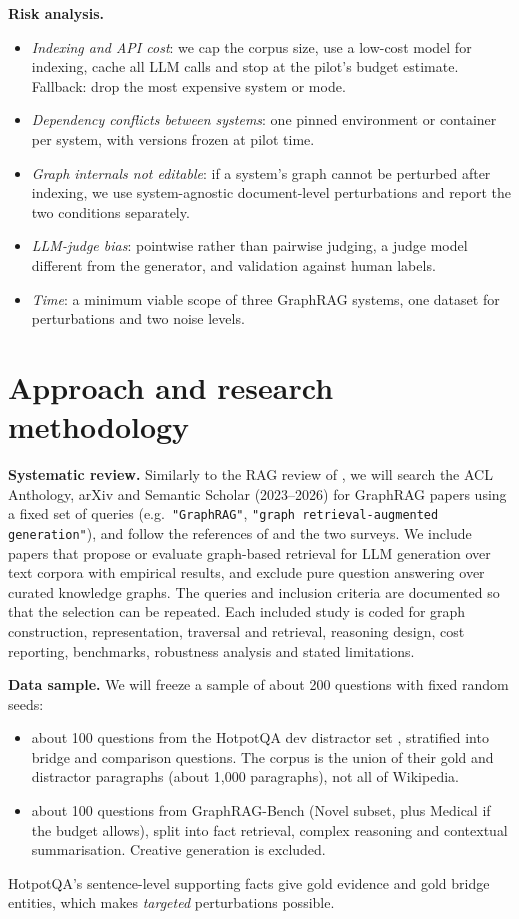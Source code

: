 \documentclass[11pt]{article}
\begin{document}
\textbf{Risk analysis.}
\begin{itemize}
\item \emph{Indexing and API cost}: we cap the corpus size, use a low-cost model for indexing, cache all LLM calls and stop at the pilot's budget estimate. Fallback: drop the most expensive system or mode.
\item \emph{Dependency conflicts between systems}: one pinned environment or container per system, with versions frozen at pilot time.
\item \emph{Graph internals not editable}: if a system's graph cannot be perturbed after indexing, we use system-agnostic document-level perturbations and report the two conditions separately.
\item \emph{LLM-judge bias}: pointwise rather than pairwise judging, a judge model different from the generator, and validation against human labels.
\item \emph{Time}: a minimum viable scope of three GraphRAG systems, one dataset for perturbations and two noise levels.
\end{itemize}

\section{Approach and research methodology}
\label{sec:method}

\textbf{Systematic review.} Similarly to the RAG review of , we will search the ACL Anthology, arXiv and Semantic Scholar (2023--2026) for GraphRAG papers using a fixed set of queries (e.g.\ \texttt{"GraphRAG"}, \texttt{"graph retrieval-augmented generation"}), and follow the references of  and the two surveys. We include papers that propose or evaluate graph-based retrieval for LLM generation over text corpora with empirical results, and exclude pure question answering over curated knowledge graphs. The queries and inclusion criteria are documented so that the selection can be repeated. Each included study is coded for graph construction, representation, traversal and retrieval, reasoning design, cost reporting, benchmarks, robustness analysis and stated limitations.

\textbf{Data sample.} We will freeze a sample of about 200 questions with fixed random seeds:
\begin{itemize}
\item about 100 questions from the HotpotQA dev distractor set \cite{yang2018hotpotqa}, stratified into bridge and comparison questions. The corpus is the union of their gold and distractor paragraphs (about 1,000 paragraphs), not all of Wikipedia.
\item about 100 questions from GraphRAG-Bench (Novel subset, plus Medical if the budget allows), split into fact retrieval, complex reasoning and contextual summarisation. Creative generation is excluded.
\end{itemize}
HotpotQA's sentence-level supporting facts give gold evidence and gold bridge entities, which makes \emph{targeted} perturbations possible.
\end{document}

